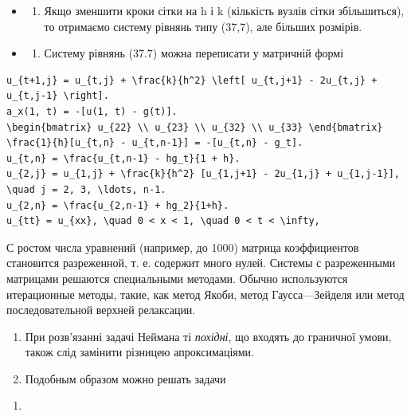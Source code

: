 \documentclass[
  ukrainian,
]{article}
\providecommand{\tightlist}{%
  \setlength{\itemsep}{0pt}\setlength{\parskip}{0pt}}
\begin{document}
\begin{itemize}
\tightlist
\item
  \begin{enumerate}
  \def\labelenumi{\arabic{enumi}.}
  \setcounter{enumi}{1}
  \tightlist
  \item
    Якщо зменшити кроки сітки на h і k (кількість вузлів сітки
    збільшиться), то отримаємо систему рівнянь типу (37,7), але більших
    розмірів.
  \end{enumerate}
\item
  \begin{enumerate}
  \def\labelenumi{\arabic{enumi}.}
  \setcounter{enumi}{2}
  \tightlist
  \item
    Систему рівнянь (37.7) можна переписати у матричній формі
  \end{enumerate}
\end{itemize}

\begin{verbatim}
u_{t+1,j} = u_{t,j} + \frac{k}{h^2} \left[ u_{t,j+1} - 2u_{t,j} + u_{t,j-1} \right].
a_x(1, t) = -[u(1, t) - g(t)].
\begin{bmatrix} u_{22} \\ u_{23} \\ u_{32} \\ u_{33} \end{bmatrix}
\frac{1}{h}[u_{t,n} - u_{t,n-1}] = -[u_{t,n} - g_t].
u_{t,n} = \frac{u_{t,n-1} - hg_t}{1 + h}.
u_{2,j} = u_{1,j} + \frac{k}{h^2} [u_{1,j+1} - 2u_{1,j} + u_{1,j-1}], \quad j = 2, 3, \ldots, n-1.
u_{2,n} = \frac{u_{2,n-1} + hg_2}{1+h}.
u_{tt} = u_{xx}, \quad 0 < x < 1, \quad 0 < t < \infty,
\end{verbatim}

С ростом числа уравнений (например, до 1000) матрица коэффициентов
становится разреженной, т. е. содержит много нулей. Системы с
разреженными матрицами решаются специальными методами. Обычно
используются итерационные методы, такие, как метод Якоби, метод
Гаусса---Зейделя или метод последовательной верхней релаксации.

\begin{enumerate}
\def\labelenumi{\arabic{enumi}.}
\setcounter{enumi}{3}
\item
  При розв'язанні задачі Неймана ті \emph{похідні}, що входять до
  граничної умови, також слід замінити різницею апроксимаціями.
\item
  Подобным образом можно решать задачи
\end{enumerate}

\begin{enumerate}
\def\labelenumi{\alph{enumi})}
\tightlist
\item
\end{enumerate}
\end{document}

